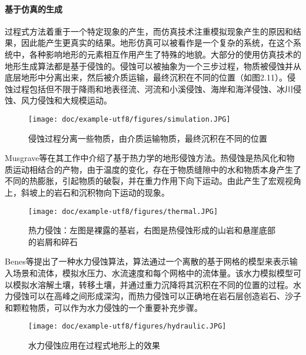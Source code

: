 \paragraph{基于仿真的生成}
过程式方法着重于一个特定现象的产生，而仿真技术注重模拟现象产生的原因和结果，因此能产生更真实的结果。地形仿真可以被看作是一个复杂的系统，在这个系统中，各种影响地形的元素相互作用产生了特殊的地貌。大部分的使用仿真技术的地形生成算法都是基于侵蚀的。侵蚀可以被抽象为一个三步过程，物质被侵蚀并从底层地形中分离出来，然后被介质运输，最终沉积在不同的位置（如图2.11）。侵蚀过程包括但不限于降雨和地表径流、河流和小溪侵蚀、海岸和海洋侵蚀、冰川侵蚀、风力侵蚀和大规模运动。\par
\begin{figure}[htbp]
\centering
\texttt{[image: doc/example-utf8/figures/simulation.JPG]}
\caption{侵蚀过程分离一些物质，由介质运输物质，最终沉积在不同的位置\supercite{eric-review}}
\end{figure}
Musgrave等\supercite{Musgrave1998T}在其工作中介绍了基于热力学的地形侵蚀方法。热侵蚀是热风化和物质运动相结合的产物，由于温度的变化，存在于物质缝隙中的水和物质本身产生了不同的热膨胀，引起物质的破裂，并在重力作用下向下运动。由此产生了宏观视角上，斜坡上的岩石和沉积物向下运动的现象。
\begin{figure}[htbp]
\centering
\texttt{[image: doc/example-utf8/figures/thermal.JPG]}
\caption{热力侵蚀：左图是裸露的基岩，右图是热侵蚀形成的山岩和悬崖底部的岩屑和碎石\supercite{eric-review}}
\end{figure}
Benes等\supercite{Bene2002Visual}提出了一种水力侵蚀算法，算法通过一个离散的基于网格的模型来表示输入场景和流体，模拟水压力、水流速度和每个网格中的流体量。该水力模拟模型可以模拟水溶解土壤，转移土壤，并通过重力沉降将其沉积在不同的位置的过程。水力侵蚀可以在高峰之间形成深沟，而热力侵蚀可以正确地在岩石层创造岩石、沙子和颗粒物质，可以作为水力侵蚀的一个重要补充步骤。
\begin{figure}[htbp]
\centering
\texttt{[image: doc/example-utf8/figures/hydraulic.JPG]}
\caption{水力侵蚀应用在过程式地形上的效果\supercite{eric-review}}
\end{figure}
